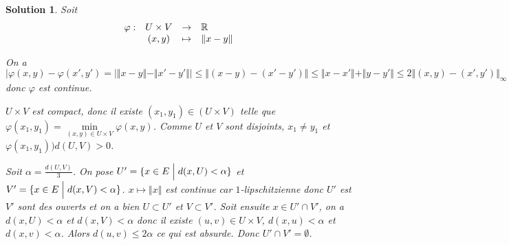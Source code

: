 \documentclass[12pt]{article}
\newtheorem{solution}{Solution}[section]
\theoremstyle{remark}
\newcommand{\function}[5]{
	$$
	\begin{array}{rccl}
		#1: & #2 & \to & #3 \\
		& #4 & \mapsto & #5
	\end{array}
	$$
}
\numberwithin{equation}{section}
\begin{document}
\begin{solution}
	Soit \function{\varphi}{U\times V}{\R}{(x,y)}{\Vert x-y\Vert}
	On a 
	$$\vert\varphi(x,y)-\varphi(x',y')=\vert\Vert x-y\Vert-\Vert x'-y'\Vert\vert\leqslant\Vert (x-y)-(x'-y')\Vert\leqslant\Vert x-x'\Vert+\Vert y-y'\Vert\leqslant2\Vert(x,y)-(x',y')\Vert_{\infty}$$
	donc $\varphi$ est continue.

	$U\times V$ est compact, donc il existe $(x_{1},y_{1})\in(U\times V)$ telle que $\varphi(x_{1},y_{1})=\min\limits_{(x,y)\in U\times V}\varphi(x,y)$. Comme $U$ et $V$ sont disjoints, $x_{1}\neq y_{1}$ et $\varphi(x_{1},y_{1}))d(U,V)>0$.

	Soit $\alpha=\frac{d(U,V)}{3}$. On pose $U'=\{x\in E\Bigm|d(x,U)<\alpha\}$ et $V'=\{x\in E\Bigm|d(x,V)<\alpha\}$. $x\mapsto\Vert x\Vert$ est continue car $1$-lipschitzienne donc $U'$ est $V'$ sont des ouverts et on a bien $U\subset U'$ et $V\subset V'$. Soit ensuite $x\in U'\cap V'$, on a $d(x,U)<\alpha$ et $d(x,V)<\alpha$ donc il existe $(u,v)\in U\times V$, $d(x,u)<\alpha$ et $d(x,v)<\alpha$. Alors $d(u,v)\leqslant2\alpha$ ce qui est absurde. Donc $U'\cap V'=\emptyset$.
\end{solution}
\end{document}
